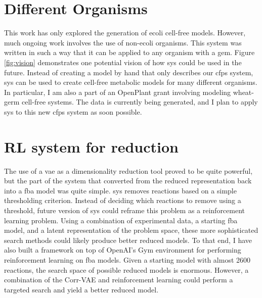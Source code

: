 \section{Different Organisms}
This work has only explored the generation of \gls{ecoli} cell-free models.
However, much ongoing work involves the use of non-\gls{ecoli} organisms.
This system was written in such a way that it can be applied to any organism with a \gls{gem}.
Figure \ref{fig:vision} demonstrates one potential vision of how \gls{sys} could be used in the future.
Instead of creating a model by hand that only describes our \gls{cfps} system, \gls{sys} can be used to create cell-free metabolic models for many different organisms.
In particular, I am also a part of an OpenPlant grant involving modeling wheat-germ cell-free systems.
The data is currently being generated, and I plan to apply \gls{sys} to this new \gls{cfps} system as soon possible.


\section{RL system for reduction}
The use of a \gls{vae} as a dimensionality reduction tool proved to be quite powerful, but the part of the system that converted from the reduced representation back into a \gls{fba} model was quite simple.
\gls{sys} removes reactions based on a simple thresholding criterion.
Instead of deciding which reactions to remove using a threshold, future version of \gls{sys} could reframe this problem as a reinforcement learning problem.
Using a combination of experimental data, a starting \gls{fba} model, and a latent representation of the problem space, these more sophisticated search methods could likely produce better reduced models.
To that end, I have also built a framework on top of OpenAI's Gym environment for performing reinforcement learning on \gls{fba} models.
Given a starting model with almost 2600 reactions, the search space of possible reduced models is enormous.
However, a combination of the Corr-VAE and reinforcement learning could perform a targeted search and yield a better reduced model.

